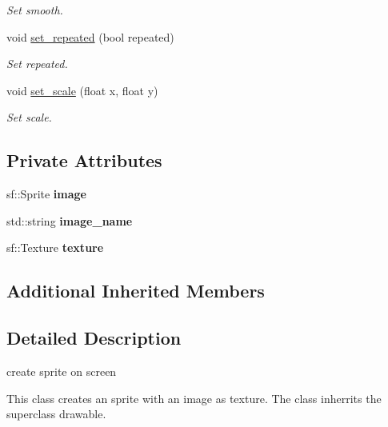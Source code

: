 \begin{DoxyCompactItemize}
\begin{DoxyCompactList}\small\item\em Set smooth. \end{DoxyCompactList}\item 
void \hyperlink{classimage__from__file_abaf0ebde2771171fdf91b55f4f6c5aa6}{set\+\_\+repeated} (bool repeated)
\begin{DoxyCompactList}\small\item\em Set repeated. \end{DoxyCompactList}\item 
void \hyperlink{classimage__from__file_a698cd91783bb6c2211ea5a3702ca60a8}{set\+\_\+scale} (float x, float y)
\begin{DoxyCompactList}\small\item\em Set scale. \end{DoxyCompactList}\end{DoxyCompactItemize}
\subsection*{Private Attributes}
\begin{DoxyCompactItemize}
\item 
\mbox{\label{classimage__from__file_a3c284697aa8a74be146dbe6429c2e66d}} 
sf\+::\+Sprite {\bfseries image}
\item 
\mbox{\label{classimage__from__file_a236ad235d4ef465070466a1c2f524a8e}} 
std\+::string {\bfseries image\+\_\+name}
\item 
\mbox{\label{classimage__from__file_acb9ae2f3e9e14f8626738700efcb9826}} 
sf\+::\+Texture {\bfseries texture}
\end{DoxyCompactItemize}
\subsection*{Additional Inherited Members}


\subsection{Detailed Description}
create sprite on screen 

This class creates an sprite with an image as texture. The class inherrits the superclass drawable.

